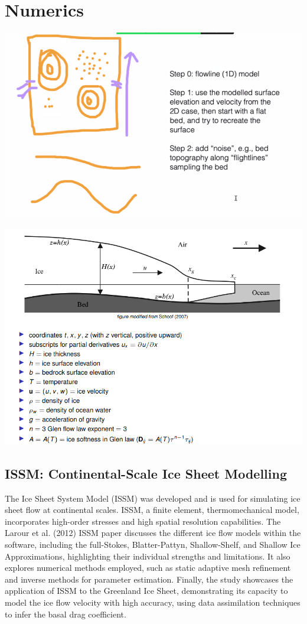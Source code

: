 \chapter{Numerics}
\begin{Figure}
\includegraphics[width=0.9\linewidth]{steps.png}
\label{fig:first_sims}
\end{Figure}

\begin{Figure}
\includegraphics[width=0.9\linewidth]{numerical_modelling_of_glaciers.png}
\label{fig:parameters}
\end{Figure}

\section{ISSM: Continental-Scale Ice Sheet Modelling}
The Ice Sheet System Model (ISSM) was developed and is used for simulating ice sheet flow at continental scales. ISSM, a finite element, thermomechanical model, incorporates high-order stresses and high spatial resolution capabilities\cite{ISSM}. The Larour et al. (2012) ISSM paper discusses the different ice flow models within the software, including the full-Stokes, Blatter-Pattyn, Shallow-Shelf, and Shallow Ice Approximations, highlighting their individual strengths and limitations. It also explores numerical methods employed, such as static adaptive mesh refinement and inverse methods for parameter estimation. Finally, the study showcases the application of ISSM to the Greenland Ice Sheet, demonstrating its capacity to model the ice flow velocity with high accuracy, using data assimilation techniques to infer the basal drag coefficient.


